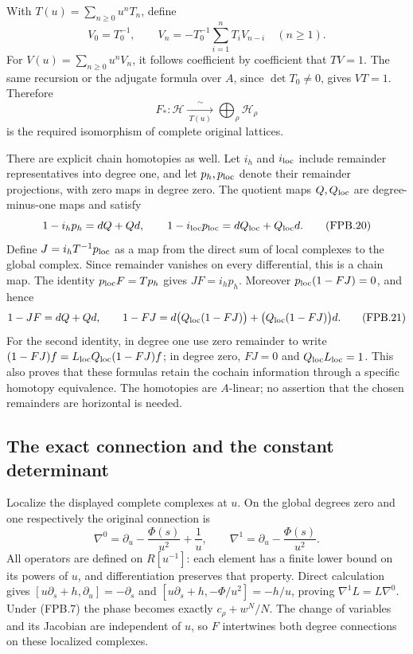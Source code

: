 With \(T(u)=\sum_{n\ge0}u^nT_n\), define
\[
 V_0=T_0^{-1},\qquad
 V_n=-T_0^{-1}\sum_{i=1}^n T_iV_{n-i}\quad(n\ge1).
 \tag{FPB.18}\label{GraphV2:eq:fpb-Tinverse}
\]
For \(V(u)=\sum_{n\ge0}u^nV_n\), it follows coefficient by
coefficient that \(TV=1\). The same
recursion or the adjugate formula over \(A\), since \(\det T_0\ne0\),
gives \(VT=1\). Therefore
\[
 F_*: \mathcal H\xrightarrow[\ T(u)\ ]{\ \sim\ }
       \bigoplus_\rho\mathcal H_\rho
 \tag{FPB.19}\label{GraphV2:eq:fpb-isomorphism}
\]
is the required isomorphism of complete original lattices.

There are explicit chain homotopies as well. Let \(i_h\) and
\(i_{\rm loc}\) include remainder representatives into degree one,
and let \(p_h,p_{\rm loc}\) denote their remainder projections,
with zero maps in degree zero. The quotient maps \(Q,Q_{\rm loc}\)
are degree-minus-one maps and satisfy
\[
 1-i_hp_h=dQ+Qd,\qquad
 1-i_{\rm loc}p_{\rm loc}=dQ_{\rm loc}+Q_{\rm loc}d.
 \tag{FPB.20}\label{GraphV2:eq:fpb-contractions}
\]
Define \(J=i_hT^{-1}p_{\rm loc}\) as a map from the direct sum of
local complexes to the global complex. Since remainder vanishes on
every differential, this is a chain map. The identity
\(p_{\rm loc}F=Tp_h\) gives \(JF=i_hp_h\). Moreover
\(p_{\rm loc}(1-FJ)=0\), and hence
\[
 1-JF=dQ+Qd,
 \qquad
 1-FJ=d\bigl(Q_{\rm loc}(1-FJ)\bigr)
          +\bigl(Q_{\rm loc}(1-FJ)\bigr)d.
 \tag{FPB.21}\label{GraphV2:eq:fpb-homotopy}
\]
For the second identity, in degree one use zero remainder to write
\((1-FJ)f=L_{\rm loc}Q_{\rm loc}(1-FJ)f\); in degree zero,
\(FJ=0\) and \(Q_{\rm loc}L_{\rm loc}=1\). This also proves that
these formulas retain the cochain information through a specific
homotopy equivalence. The homotopies are \(A\)-linear; no assertion
that the chosen remainders are horizontal is needed.

\subsection{The exact connection and the constant determinant}

Localize the displayed complete complexes at \(u\). On the global
degrees zero and one respectively the original connection is
\[
 \nabla^0=\partial_u-\frac{\Phi(s)}{u^2}+\frac1u,
 \qquad
 \nabla^1=\partial_u-\frac{\Phi(s)}{u^2}.
 \tag{FPB.22}\label{GraphV2:eq:fpb-chain-connection}
\]
All operators are defined on \(R[u^{-1}]\): each element has a
finite lower bound on its powers of \(u\), and differentiation
preserves that property. Direct calculation gives
\([u\partial_s+h,\partial_u]=-\partial_s\) and
\([u\partial_s+h,-\Phi/u^2]=-h/u\), proving
\(\nabla^1L=L\nabla^0\). Under (FPB.7) the phase becomes exactly
\(c_\rho+w^N/N\). The change of variables and its Jacobian are
independent of \(u\), so \(F\) intertwines both degree connections
on these localized complexes.

